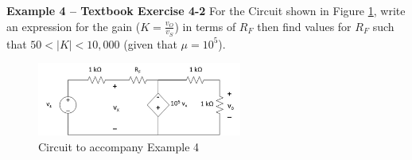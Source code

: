 \documentclass{handout}
\begin{document}


%
%
%
%
%

\textbf{Example 4 -- Textbook Exercise 4-2}
For the Circuit shown in Figure \ref{fig: Example4}, write an expression for the gain ($K=\frac{v_O}{v_S}$) in terms of $R_F$ then find values for $R_F$ such that $50<|K|<10,000$ (given that $\mu=10^5$).
\begin{figure}[h! t! b!]
\centering
\includegraphics[width=0.6\textwidth]{Example4.jpg}
\caption{Circuit to accompany Example 4}
\label{fig: Example4}
\end{figure}
\end{document}
